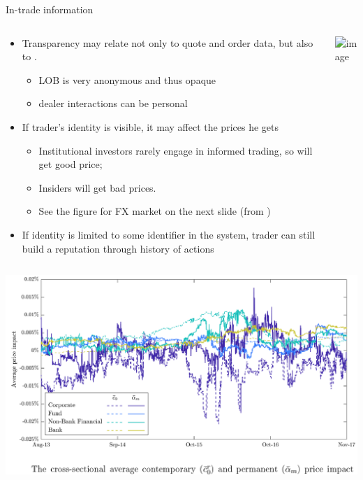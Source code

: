 \documentclass[english,10pt
,aspectratio=169
]{beamer}
\begin{document}
\begin{frame}{In-trade information}
	\begin{columns}
		\begin{column}{0.7\linewidth}
			{
				\begin{itemize}
					\item Transparency may relate not only to quote and order data, but also to .
					\begin{itemize}
						\item LOB is very anonymous and thus opaque
						\item dealer interactions can be personal
					\end{itemize}
					\pause
					\item If trader's identity is visible, it may affect the prices he gets
					\begin{itemize}
						\item Institutional investors rarely engage in informed trading, so will get good price;
						\item Insiders will get bad prices.
						\item See the figure for FX market on the next slide (from \cite{ranaldo_asymmetric_2019})
					\end{itemize}
					\pause
					\item If identity is limited to some identifier in the system, trader can still build a reputation through history of actions
				\end{itemize}
			}
		\end{column}
		\begin{column}{0.3\linewidth}
			\pause[1]
			\includegraphics<handout:0>[width=\linewidth]{pics/incognito}
		\end{column}
	\end{columns}
\end{frame}


\begin{frame}
	\includegraphics[width=\linewidth]{pics/RS}
\end{frame}
\end{document}

